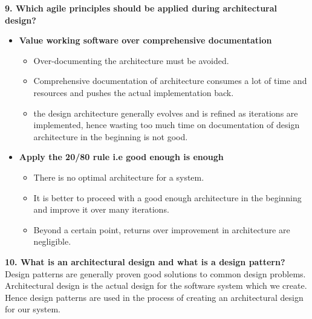 \documentclass[12pt,letterpaper,titlepage,en-US]{article}
\begin{document}
       
       
        

    
    
    
    \textbf{9. Which agile principles should be applied during architectural design?}
    
    \begin{itemize}[noitemsep,nolistsep]
    \item \textbf{Value working software over comprehensive documentation}
    
    \begin{itemize}[noitemsep,nolistsep]
    \item Over-documenting the architecture must be avoided.
    \item Comprehensive documentation of architecture consumes a lot of time and resources and pushes the actual implementation back.
    \item the design architecture generally evolves and is refined as iterations are implemented, hence wasting too much time on documentation of design architecture in the beginning is not good.
    \end{itemize}
    
    
    \item \textbf{Apply the 20/80 rule i.e good enough is enough}
 
    \begin{itemize}[noitemsep,nolistsep]
    \item There is no optimal architecture for a system.
    \item It is better to proceed with a good enough architecture in the beginning and improve it over many iterations.
    \item Beyond a certain point, returns over improvement in architecture are negligible.\\
    \end{itemize}
    
    \end{itemize}
    
    
    
   \textbf {10. What is an architectural design and what is a design pattern?}\\
  Design patterns are generally proven good solutions to common design problems. Architectural design is the actual design for the software system which we create. Hence design patterns are used in the process of creating an architectural design for our system.\\
  
\end{document}

